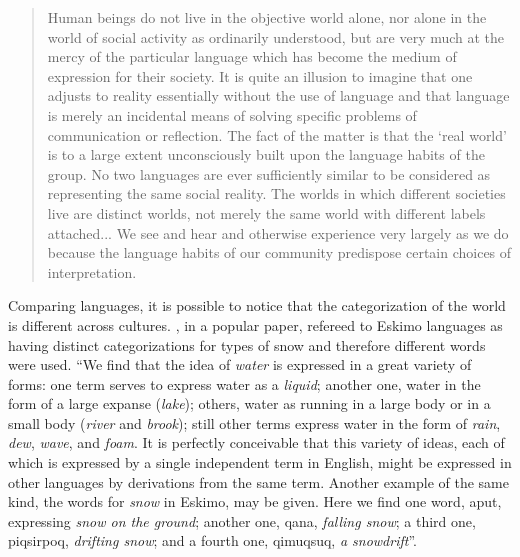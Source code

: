\begin{quote}
Human beings do not live in the objective world alone, nor alone in the world of social activity as ordinarily understood, 
but are very much at the mercy of the particular language which has become the medium of expression for their society. 
It is quite an illusion to imagine that one adjusts to reality essentially without the use of language and that language 
is merely an incidental means of solving specific problems of communication or reflection. The fact of the matter is that 
the `real world' is to a large extent unconsciously built upon the language habits of the group. No two languages are ever 
sufficiently similar to be considered as representing the same social reality. The worlds in which different societies live 
are distinct worlds, not merely the same world with different labels attached... We see and hear and otherwise experience 
very largely as we do because the language habits of our community predispose certain choices of interpretation. \citep{sapir1929}
\end{quote}



Comparing languages, it is possible to notice that the categorization of the world is different across cultures. 
\cite{whorf1940}, in a popular paper, refereed to Eskimo languages as having distinct categorizations 
for types of snow and therefore different words were used.
``We find that the idea of \textit{water} is expressed in a great variety of forms: 
one term serves to express water as a \textit{liquid}; another one, water in the form of a large expanse (\textit{lake});
others, water as running in a large body or in a small body (\textit{river} and \textit{brook}); 
still other terms express water in the form of \textit{rain}, \textit{dew}, \textit{wave}, and \textit{foam}. 
It is perfectly conceivable that this variety of ideas, each of which is expressed by a single independent term in English, 
might be expressed in other languages by derivations from the same term. Another example of the same kind, the words for 
\textit{snow} in Eskimo, may be given. Here we find one word, aput, expressing \textit{snow on the ground}; 
another one, qana, \textit{falling snow}; a third one, piqsirpoq, \textit{drifting snow}; and a fourth one, 
qimuqsuq, \textit{a snowdrift}''.%


